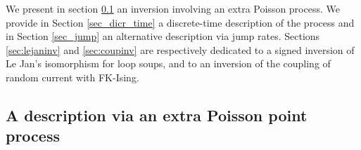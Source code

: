 \documentclass[11pt,a4paper]{amsart}
\numberwithin{equation}{section}
\begin{document}
We present in section \ref{sec_Poisson}
an inversion involving an extra Poisson process. We provide in Section \ref{sec_dicr_time} a discrete-time description of the process and in Section \ref{sec_jump} an alternative description via jump rates.  Sections \ref{sec:lejaninv} and \ref{sec:coupinv} are respectively dedicated to a signed inversion of Le Jan's isomorphism for loop soups, and to an inversion of the coupling of random current with FK-Ising.

\subsection{A description via an extra Poisson point process}\label{sec_Poisson}
\end{document}
